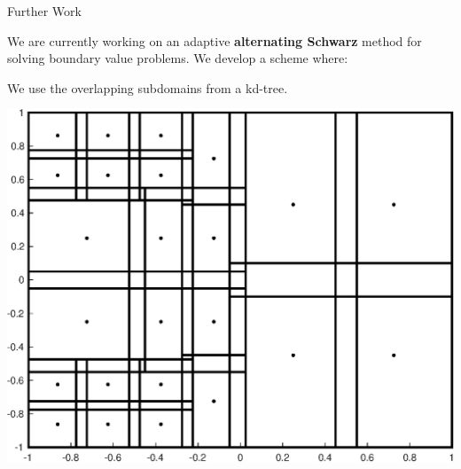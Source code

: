 \documentclass{beamer}
\begin{document}
\begin{frame}{Further Work}
	\begin{center}
		We are currently working on an adaptive \textbf{alternating Schwarz} method for solving boundary value problems. We develop a scheme where:
	\end{center}
	\begin{center}
		We use the overlapping subdomains from a kd-tree.
	\end{center}

	\begin{center}
		\includegraphics[scale = 0.3]{domainPlot.eps}
	\end{center}
\end{frame}
\end{document}
